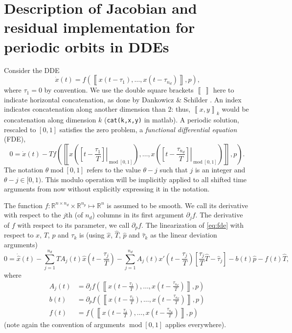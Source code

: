 \documentclass[11pt]{scrartcl}
\newcommand{\blist}[1]{\mbox{\lstinline!#1!}}
\newcommand{\R}{\mathbb{R}}
\renewcommand{\mod}{\operatorname{mod}}
\newcommand{\llb}{\left\llbracket}
\newcommand{\rrb}{\right\rrbracket}
\begin{document}
\section*{Description of Jacobian and residual implementation for
  periodic orbits in DDEs}
Consider the DDE
\begin{equation}
  \label{eq:dde}
  \dot x(t)=f(\llb x(t-\tau_1),\ldots,x(t-\tau_{n_d})\rrb,p)\mbox{,}
\end{equation}
where $\tau_1=0$ by convention. We use the double square brackets
$\llb\,\rrb$ here to indicate horizontal concatenation, as done by
Dankowicz \& Schilder \cite{HS13}. An index indicates concatenation
along another dimension than $2$: thus, $\llb x, y\rrb_k$ would be
concatenation along dimension $k$ (\blist{cat(k,x,y)} in matlab). A
periodic solution, rescaled to $[0,1]$ satisfies the zero problem, a
\emph{functional differential equation} (FDE),
\begin{equation}
  \label{eq:fde}
  0=\dot x(t)-Tf\left(\llb x\left(
      \left.\left[t-\frac{\tau_1}{T}\right]\right\vert_{\mod{[0,1]}}\right),\ldots,
    x\left(\left.\left[t-\frac{\tau_{n_d}}{T}\right]\right\vert_{\mod{[0,1]}}\right)\rrb,p\right)\mbox{.}
\end{equation}
The notation $\theta\mod[0,1]$ refers to the value $\theta-j$ such
that $j$ is an integer and $\theta-j\in[0,1)$. This modulo operation
will be implicitly applied to all shifted time arguments from now
without explicitly expressing it in the notation. 

The function $f:\R^{n\times n_d}\times \R^{n_p}\mapsto \R^n$ is
assumed to be smooth. We call its derivative with respect to the $j$th
(of $n_d$) columns in its first argument $\partial_jf$. The derivative
of $f$ with respect to its parameter, we call $\partial_pf$. The
linearization of \eqref{eq:fde} with respect to $x$, $T$, $p$ and
$\tau_k$ is (using $\hat x$, $\hat T$, $\hat p$ and $\hat \tau_k$ as
the linear deviation arguments)
\begin{equation}
  \label{eq:linfde}
  0=\Dot{\hat x}(t)-\sum_{j=1}^{n_d}TA_j(t)\hat x
  \left(t-\frac{\tau_j}{T}\right)- \sum_{j=1}^{n_d}A_j(t)
  x'\left(t-\frac{\tau_j}{T}\right) \left[\frac{\tau_j}{T}\hat T-\hat
    \tau_j\right] -b(t)\hat p-f(t)\hat T\mbox{,}
\end{equation}
where
\begin{align*}
  A_j(t)&=\partial_jf\left(\llb x\left(t-\frac{\tau_1}{T}\right),\ldots,x\left(t-\frac{\tau_{n_d}}{T}\right)\rrb,p\right)\\
  b(t)&=\partial_pf\left(\llb x\left(t-\frac{\tau_1}{T}\right),\ldots,x\left(t-\frac{\tau_{n_d}}{T}\right)\rrb,p\right)\\
  f(t)&=f\left(\llb x\left(t-\frac{\tau_1}{T}\right),\ldots,x\left(t-\frac{\tau_{n_d}}{T}\right)\rrb,p\right)
\end{align*}
(note again the convention of arguments $\mod[0,1]$ applies everywhere). 
\end{document}
